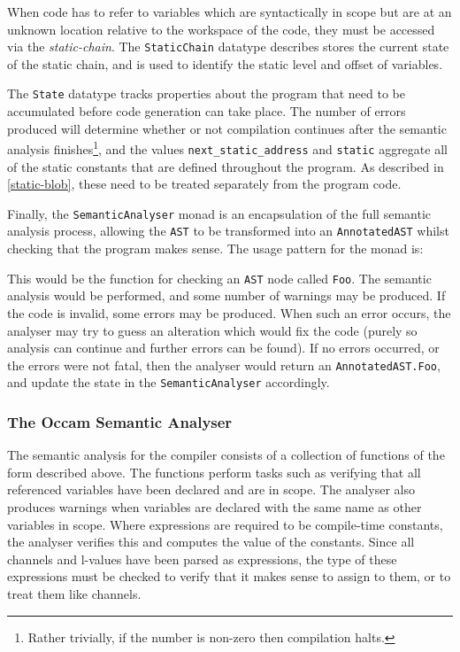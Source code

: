 When code has to refer to variables which are syntactically in scope but are at
an unknown location relative to the workspace of the code, they must be accessed
via the \textit{\gls{static-chain}}. The \texttt{StaticChain} datatype describes
stores the current state of the static chain, and is used to identify the static
level and offset of variables.

The \texttt{State} datatype tracks properties about the program that need to be
accumulated before code generation can take place. The number of errors produced
will determine whether or not compilation continues after the semantic analysis
finishes\footnote{Rather trivially, if the number is non-zero then compilation
halts.}, and the values \texttt{next\_static\_address} and \texttt{static}
aggregate all of the static constants that are defined throughout the program.
As described in \ref{static-blob}, these need to be treated separately from the
program code.

Finally, the \texttt{SemanticAnalyser} monad is an encapsulation of the full
semantic analysis process, allowing the \texttt{AST} to be transformed into an
\texttt{AnnotatedAST} whilst checking that the program makes sense. The usage
pattern for the monad is:

This would be the function for checking an \texttt{AST} node called
\texttt{Foo}. The semantic analysis would be performed, and some number of
warnings may be produced. If the code is invalid, some errors may be produced.
When such an error occurs, the analyser may try to guess an alteration which
would fix the code (purely so analysis can continue and further errors can be
found). If no errors occurred, or the errors were not fatal, then the analyser
would return an \texttt{AnnotatedAST.Foo}, and update the state in the
\texttt{SemanticAnalyser} accordingly.

\subsubsection{The Occam Semantic Analyser}

The semantic analysis for the compiler consists of a collection of functions of
the form described above. The functions perform tasks such as verifying that all
referenced variables have been declared and are in scope. The analyser also
produces warnings when variables are declared with the same name as other
variables in scope. Where expressions are required to be compile-time constants,
the analyser verifies this and computes the value of the constants. Since all
channels and l-values have been parsed as expressions, the type of these
expressions must be checked to verify that it makes sense to assign to them, or
to treat them like channels.

